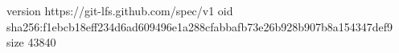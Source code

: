 version https://git-lfs.github.com/spec/v1
oid sha256:f1ebcb18eff234d6ad609496e1a288cfabbafb73e26b928b907b8a154347def9
size 43840
